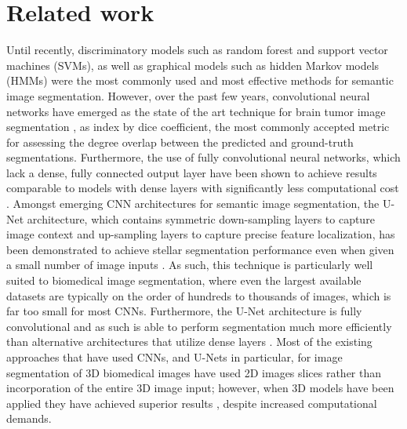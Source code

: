 \documentclass{article}
\newcommand\tab[1][0.5cm]{\hspace*{#1}}
\begin{document}
\section{Related work}
\tab Until recently, discriminatory models such as random forest and support vector machines (SVMs), as well as graphical models such as hidden Markov models (HMMs) were the most commonly used and most effective methods for semantic image segmentation. However, over the past few years, convolutional neural networks have emerged as the state of the art technique for brain tumor image segmentation \cite{DBLP:journals/corr/HavaeiDWBCBPJL15, Shelhamer, DBLP:journals/corr/NovikovMLHWB17}, as index by dice coefficient, the most commonly accepted metric for assessing the degree overlap between the predicted and ground-truth segmentations. Furthermore, the use of fully convolutional neural networks, which lack a dense, fully connected output layer have been shown to achieve results comparable to models with dense layers with significantly less computational cost \cite{Shelhamer}. Amongst emerging CNN architectures for semantic image segmentation, the U-Net architecture, which contains symmetric down-sampling layers to capture image context and up-sampling layers to capture precise feature localization, has been demonstrated to achieve stellar segmentation performance even when given a small number of image inputs \cite{DBLP:journals/corr/RonnebergerFB15}. As such, this technique is particularly well suited to biomedical image segmentation, where even the largest available datasets are typically on the order of hundreds to thousands of images, which is far too small for most CNNs. Furthermore, the U-Net architecture is fully convolutional and as such is able to perform segmentation much more efficiently than alternative architectures that utilize dense layers \cite{DBLP:journals/corr/RonnebergerFB15}. Most of the existing approaches that have used CNNs, and U-Nets in particular, for image segmentation of 3D biomedical images have used 2D images slices rather than incorporation of the entire 3D image input; however, when 3D models have been applied they have achieved superior results \cite{DBLP:journals/corr/KamnitsasLNSKMR16}, despite increased computational demands. 
\end{document}
